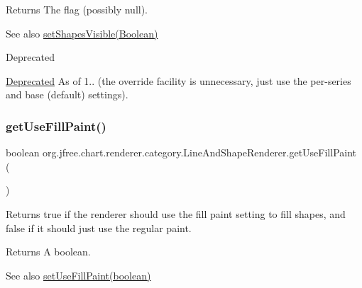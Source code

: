 \begin{DoxyReturn}{Returns}
The flag (possibly {\ttfamily null}).
\end{DoxyReturn}
\begin{DoxySeeAlso}{See also}
\mbox{\hyperlink{classorg_1_1jfree_1_1chart_1_1renderer_1_1category_1_1_line_and_shape_renderer_a478523c511be1a42589ca7ada236d335}{set\+Shapes\+Visible(\+Boolean)}}
\end{DoxySeeAlso}
\begin{DoxyRefDesc}{Deprecated}
\item[\mbox{\hyperlink{deprecated__deprecated000189}{Deprecated}}]As of 1.. (the override facility is unnecessary, just use the per-\/series and base (default) settings). \end{DoxyRefDesc}
\mbox{\label{classorg_1_1jfree_1_1chart_1_1renderer_1_1category_1_1_line_and_shape_renderer_a3bef1f4102b2426d4eddedb81394037c}} 
\subsubsection{\texorpdfstring{get\+Use\+Fill\+Paint()}{getUseFillPaint()}}
{\footnotesize\ttfamily boolean org.\+jfree.\+chart.\+renderer.\+category.\+Line\+And\+Shape\+Renderer.\+get\+Use\+Fill\+Paint (\begin{DoxyParamCaption}{ }\end{DoxyParamCaption})}

Returns {\ttfamily true} if the renderer should use the fill paint setting to fill shapes, and {\ttfamily false} if it should just use the regular paint.

\begin{DoxyReturn}{Returns}
A boolean.
\end{DoxyReturn}
\begin{DoxySeeAlso}{See also}
\mbox{\hyperlink{classorg_1_1jfree_1_1chart_1_1renderer_1_1category_1_1_line_and_shape_renderer_ab3eb0245173ab97f09ab32375ed958ad}{set\+Use\+Fill\+Paint(boolean)}} 
\end{DoxySeeAlso}
\mbox{\label{classorg_1_1jfree_1_1chart_1_1renderer_1_1category_1_1_line_and_shape_renderer_aa23a1600374c274ce77436ef383923ea}} 
